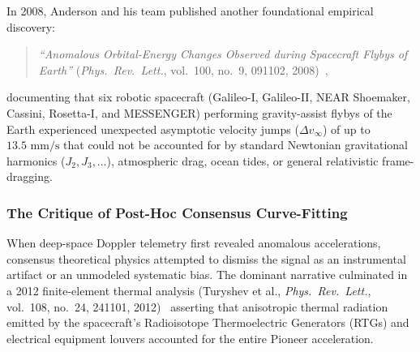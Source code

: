 \documentclass[11pt,a4paper]{article}
\begin{document}
In 2008, Anderson and his team published another foundational empirical discovery:
\begin{quote}
\textit{``Anomalous Orbital-Energy Changes Observed during Spacecraft Flybys of Earth''} (\textit{Phys.~Rev.~Lett.}, vol.~100, no.~9, 091102, 2008)~\cite{Anderson2008},
\end{quote}
documenting that six robotic spacecraft (Galileo-I, Galileo-II, NEAR Shoemaker, Cassini, Rosetta-I, and MESSENGER) performing gravity-assist flybys of the Earth experienced unexpected asymptotic velocity jumps ($\Delta v_\infty$) of up to $13.5\text{ mm/s}$ that could not be accounted for by standard Newtonian gravitational harmonics ($J_2, J_3, \dots$), atmospheric drag, ocean tides, or general relativistic frame-dragging.

\subsubsection{The Critique of Post-Hoc Consensus Curve-Fitting}
\label{subsubsec:critique_curve_fitting}

When deep-space Doppler telemetry first revealed anomalous accelerations, consensus theoretical physics attempted to dismiss the signal as an instrumental artifact or an unmodeled systematic bias. The dominant narrative culminated in a 2012 finite-element thermal analysis (Turyshev et al., \textit{Phys.~Rev.~Lett.}, vol.~108, no.~24, 241101, 2012)~\cite{Turyshev2012} asserting that anisotropic thermal radiation emitted by the spacecraft's Radioisotope Thermoelectric Generators (RTGs) and electrical equipment louvers accounted for the entire Pioneer acceleration.
\end{document}
